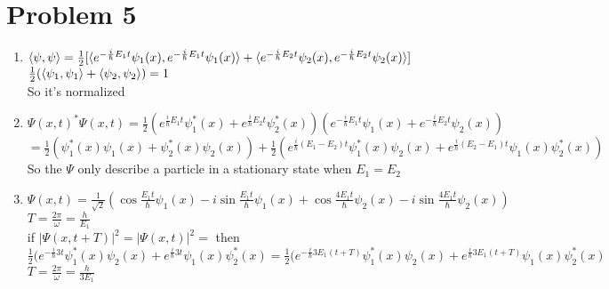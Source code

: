 \documentclass[a4paper]{article}
\begin{document}
\section{Problem 5}
    \begin{enumerate}
        \item $\braket{\psi,\psi}=\frac{1}{2}[\braket{e^{-\frac{i}{\hbar}E_1t}\psi_1(x),e^{-\frac{i}{\hbar}E_1t}\psi_1(x)}+\braket{e^{-\frac{i}{\hbar}E_2t}\psi_2(x),e^{-\frac{i}{\hbar}E_2t}\psi_2(x)}]$
        \\$\frac{1}{2}(\braket{\psi_1,\psi_1}+\braket{\psi_2,\psi_2})=1$
        \\So it's normalized
        \item $\Psi(x,t)^*\Psi(x,t)=\frac{1}{2}(e^{\frac{i}{\hbar}E_1t}\psi_1^*(x)+e^{\frac{i}{\hbar}E_2t}\psi_2^*(x))(e^{-\frac{i}{\hbar}E_1t}\psi_1(x)+e^{-\frac{i}{\hbar}E_2t}\psi_2(x))$
        \\$=\frac{1}{2}(\psi_1^*(x)\psi_1(x)+\psi_2^*(x)\psi_2(x))+\frac{1}{2}(e^{\frac{i}{\hbar}(E_1-E_2)t}\psi_1^*(x)\psi_2(x)+e^{\frac{i}{\hbar}(E_2-E_1)t}\psi_1(x)\psi_2^*(x))$
        \\So the $\Psi$ only describe a particle in a stationary state when $E_1=E_2$
        \item $\Psi(x,t)=\frac{1}{\sqrt{2}}(\cos\frac{E_1t}{\hbar}\psi_1(x)-i\sin\frac{E_1t}{\hbar}\psi_1(x)+\cos\frac{4E_1t}{\hbar}\psi_2(x)-i\sin\frac{4E_1t}{\hbar}\psi_2(x))$
        \\$T=\frac{2\pi}{\omega}=\frac{h}{E_1}$
        \\if $|\Psi(x,t+T)|^2=|\Psi(x,t)|^2=$ then 
        \\$\frac{1}{2}(e^{-\frac{i}{\hbar}3t}\psi_1^*(x)\psi_2(x)+e^{\frac{i}{\hbar}3t}\psi_1(x)\psi_2^*(x)=\frac{1}{2}(e^{-\frac{i}{\hbar}3E_1(t+T)}\psi_1^*(x)\psi_2(x)+e^{\frac{i}{\hbar}3E_1(t+T)}\psi_1(x)\psi_2^*(x)$
        \\$T=\frac{2\pi}{\omega}=\frac{h}{3E_1}$
        
    \end{enumerate}
\end{document}
